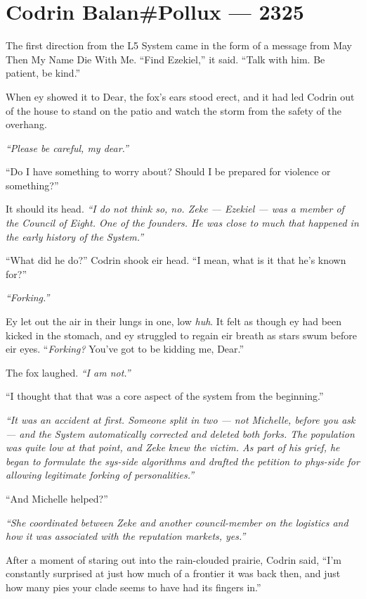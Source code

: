 \hypertarget{codrin-balanpollux-2325}{%
\chapter{Codrin Balan\#Pollux — 2325}\label{codrin-balanpollux-2325}}

The first direction from the L5 System came in the form of a message from May Then My Name Die With Me. ``Find Ezekiel,'' it said. ``Talk with him. Be patient, be kind.''

When ey showed it to Dear, the fox's ears stood erect, and it had led Codrin out of the house to stand on the patio and watch the storm from the safety of the overhang.

\emph{``Please be careful, my dear.''}

``Do I have something to worry about? Should I be prepared for violence or something?''

It should its head. \emph{``I do not think so, no. Zeke — Ezekiel — was a member of the Council of Eight. One of the founders. He was close to much that happened in the early history of the System.''}

``What did he do?'' Codrin shook eir head. ``I mean, what is it that he's known for?''

\emph{``Forking.''}

Ey let out the air in their lungs in one, low \emph{huh}. It felt as though ey had been kicked in the stomach, and ey struggled to regain eir breath as stars swum before eir eyes. ``\emph{Forking?} You've got to be kidding me, Dear.''

The fox laughed. \emph{``I am not.''}

``I thought that that was a core aspect of the system from the beginning.''

\emph{``It was an accident at first. Someone split in two — not Michelle, before you ask — and the System automatically corrected and deleted both forks. The population was quite low at that point, and Zeke knew the victim. As part of his grief, he began to formulate the sys-side algorithms and drafted the petition to phys-side for allowing legitimate forking of personalities.''}

``And Michelle helped?''

\emph{``She coordinated between Zeke and another council-member on the logistics and how it was associated with the reputation markets, yes.''}

After a moment of staring out into the rain-clouded prairie, Codrin said, ``I'm constantly surprised at just how much of a frontier it was back then, and just how many pies your clade seems to have had its fingers in.''

